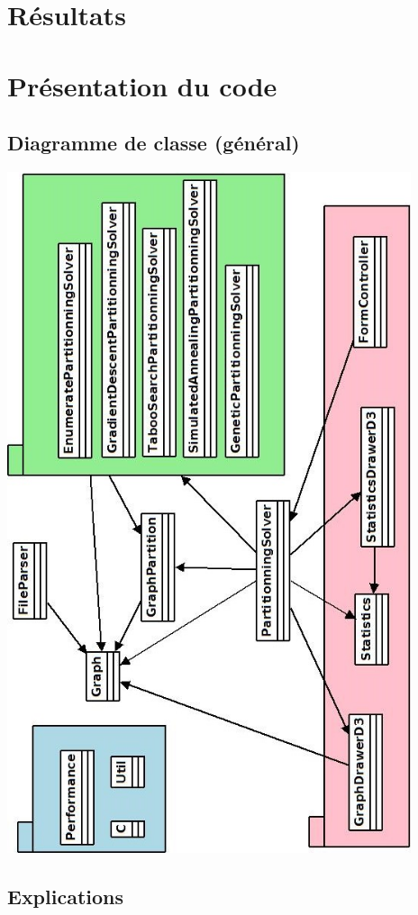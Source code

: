 \documentclass[12pt]{article}
\begin{document}
\section{Résultats}

\section{Présentation du code}

\subsection{Diagramme de classe (général)}

\includegraphics[height=20cm]{classeGraph.jpeg}

\subsection{Explications}
\end{document}
